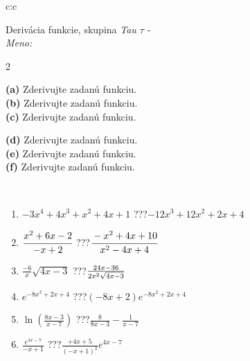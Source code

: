 \documentclass[10pt]{report}
\begin{document}
\newpage
\thispagestyle{empty}
\begin{tabular}{c:c}
\begin{minipage}[c][104.5mm][t]{0.5\linewidth}
\begin{center}
\vspace{7mm}
{\huge Derivácia funkcie, skupina \textit{Tau $\tau$} -}\\[5mm]
\textit{Meno:}\phantom{xxxxxxxxxxxxxxxxxxxxxxxxxxxxxxxxxxxxxxxxxxxxxxxxxxxxxxxxxxxxxxxxx}\\[5mm]
\begin{minipage}{0.95\linewidth}
\begin{center}
{\small \begin{multicols}{2} \raggedright
\textbf{(a)} Zderivujte zadanú funkciu. \\[1mm]
\textbf{(b)} Zderivujte zadanú funkciu. \\[1mm]
\textbf{(c)} Zderivujte zadanú funkciu. \par \columnbreak
\textbf{(d)} Zderivujte zadanú funkciu. \\[1mm]
\textbf{(e)} Zderivujte zadanú funkciu. \\[1mm]
\textbf{(f)} Zderivujte zadanú funkciu.
\end{multicols}
}
\end{center}
\end{minipage}
\\[4mm]
\begin{minipage}{0.79\linewidth}
\begin{center}
\begin{varwidth}{\linewidth}
\begin{enumerate}
\normalsize
\item $-3x^4+4x^3+x^2+4x+1$\quad \dotfill\; ???\;\dotfill \quad $-12x^3+12x^2+2x+4$
\item $\cfrac{x^2+6x-2}{-x+2}$\quad \dotfill\; ???\;\dotfill \quad $\cfrac{-x^2+4x+10}{x^2-4x+4}$
\item $\frac{-6}{x}\sqrt{4x-3}$\quad \dotfill\; ???\;\dotfill \quad $\frac{24x-36}{2x^2 \sqrt{\smash[b]{4x-3}}}$
\item $e^{-8x^2+2x+4}$\quad \dotfill\; ???\;\dotfill \quad $(-8x+2)e^{-8x^2+2x+4}$
\item $\ln{\left(\frac{8x-3}{x-7}\right)}$\quad \dotfill\; ???\;\dotfill \quad $\frac{8}{8x-3}-\frac{1}{x-7}$
\item $\frac{e^{4x-7}}{-x+1}$\quad \dotfill\; ???\;\dotfill \quad $\frac{+4x+5}{(-x+1)^2}e^{4x-7}$
\end{enumerate}

\end{varwidth}
\end{center}
\end{minipage}
\end{center}
\end{minipage}
\end{tabular}
\end{document}
